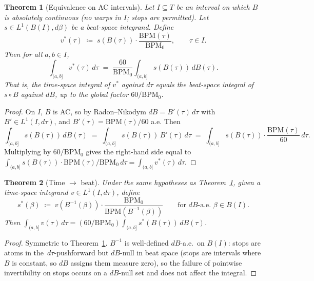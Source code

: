 \documentclass[11pt]{article}
\newtheorem{theorem}{Theorem}
\theoremstyle{definition}
\newcommand{\bpmz}{\mathrm{BPM}_0}
\newcommand{\bpm}{\mathrm{BPM}}
\newcommand{\dB}{\,dB}
\newcommand{\dtau}{\,d\tau}
\newcommand{\Lone}{L^{1}}
\begin{document}
\begin{theorem}[Equivalence on AC intervals]
\label{thm:conversion}
Let $I \subseteq T$ be an interval on which $B$ is absolutely continuous (no
warps in $I$; stops are permitted). Let $s \in \Lone(B(I), d\beta)$ be a
beat-space integrand. Define
\begin{equation}
\label{eq:beat-to-time}
v^*(\tau) \;\coloneqq\; s(B(\tau)) \cdot \frac{\bpm(\tau)}{\bpmz}, \qquad \tau \in I.
\end{equation}
Then for all $a, b \in I$,
\[
\int_{(a,b]} v^*(\tau)\dtau
\;=\; \frac{60}{\bpmz} \int_{(a,b]} s(B(\tau))\dB(\tau).
\]
That is, the time-space integral of $v^*$ against $d\tau$ equals the
beat-space integral of $s \circ B$ against $dB$, up to the global factor
$60/\bpmz$.
\end{theorem}

\begin{proof}
On $I$, $B$ is AC, so by Radon--Nikodym $dB = B'(\tau)\dtau$ with
$B' \in \Lone(I, d\tau)$, and $B'(\tau) = \bpm(\tau)/60$ a.e. Then
\[
\int_{(a,b]} s(B(\tau))\dB(\tau)
\;=\; \int_{(a,b]} s(B(\tau))\, B'(\tau)\dtau
\;=\; \int_{(a,b]} s(B(\tau)) \cdot \frac{\bpm(\tau)}{60}\dtau.
\]
Multiplying by $60/\bpmz$ gives the right-hand side equal to
$\int_{(a,b]} s(B(\tau)) \cdot \bpm(\tau)/\bpmz \dtau = \int_{(a,b]} v^*(\tau)\dtau$.
\qedhere
\end{proof}

\begin{theorem}[Time $\to$ beat]
\label{thm:t2b}
Under the same hypotheses as Theorem~\ref{thm:conversion}, given a time-space
integrand $v \in \Lone(I, d\tau)$, define
\begin{equation}
\label{eq:time-to-beat}
s^*(\beta) \;\coloneqq\; v(B^{-1}(\beta)) \cdot \frac{\bpmz}{\bpm(B^{-1}(\beta))}
\qquad \text{for } dB\text{-a.e.\ } \beta \in B(I).
\end{equation}
Then $\int_{(a,b]} v(\tau)\dtau = (60/\bpmz) \int_{(a,b]} s^*(B(\tau))\dB(\tau)$.
\end{theorem}

\begin{proof}
Symmetric to Theorem~\ref{thm:conversion}. $B^{-1}$ is well-defined
$dB$-a.e.\ on $B(I)$: stops are atoms in the $\dtau$-pushforward but
$dB$-null in beat space (stops are intervals where $B$ is constant, so $dB$
assigns them measure zero), so the failure of pointwise invertibility on
stops occurs on a $dB$-null set and does not affect the integral.
\qedhere
\end{proof}
\end{document}
